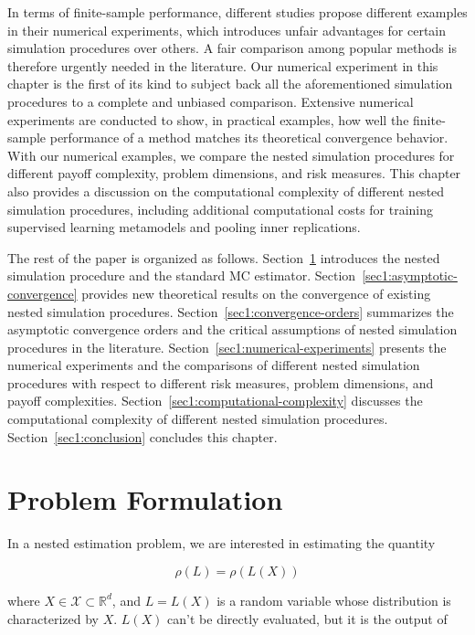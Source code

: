 In terms of finite-sample performance, different studies propose different examples in their numerical experiments, which introduces unfair advantages for certain simulation procedures over others. 
A fair comparison among popular methods is therefore urgently needed in the literature. 
Our numerical experiment in this chapter is the first of its kind to subject back all the aforementioned simulation procedures to a complete and unbiased comparison. 
Extensive numerical experiments are conducted to show, in practical examples, how well the finite-sample performance of a method matches its theoretical convergence behavior. 
With our numerical examples, we compare the nested simulation procedures for different payoff complexity, problem dimensions, and risk measures. 
This chapter also provides a discussion on the computational complexity of different nested simulation procedures, including additional computational costs for training supervised learning metamodels and pooling inner replications.

The rest of the paper is organized as follows.
Section~\ref{sec1:problem-formulation} introduces the nested simulation procedure and the standard MC estimator.
Section~\ref{sec1:asymptotic-convergence} provides new theoretical results on the convergence of existing nested simulation procedures.
Section~\ref{sec1:convergence-orders} summarizes the asymptotic convergence orders and the critical assumptions of nested simulation procedures in the literature.
Section~\ref{sec1:numerical-experiments} presents the numerical experiments and the comparisons of different nested simulation procedures with respect to different risk measures, problem dimensions, and payoff complexities.
Section~\ref{sec1:computational-complexity} discusses the computational complexity of different nested simulation procedures.
Section~\ref{sec1:conclusion} concludes this chapter.

\section{Problem Formulation} \label{sec1:problem-formulation}

In a nested estimation problem, we are interested in estimating the quantity 

$$\rho(L) = \rho(L(X))$$

where $X \in \mathcal{X} \subset \mathbb{R}^d$, and $L = L(X)$ is a random variable whose distribution is characterized by $X$.
$L(X)$ can't be directly evaluated, but it is the output of 

